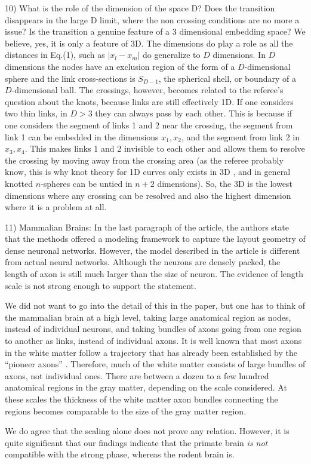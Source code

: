 \documentclass[11pt]{article}
\begin{document}
\begin{response}{
10) What is the role of the dimension of the space D? Does the transition disappears in the large D limit, where the non crossing conditions are no more a issue? Is the transition a genuine feature of a 3 dimensional embedding space?
}
We believe, yes, it is only a feature of 3D.
The dimensions do play a role as all the distances in Eq.(1), such as $|x_l-x_m|$ do generalize to $D$ dimensions. 
In $D$ dimensions the nodes have an exclusion region of the form of a $D$-dimensional sphere and the link cross-sections is $S_{D-1}$, the spherical shell, or boundary of a $D$-dimensional ball. 
The crossings, however, becomes related to the referee's question about the knots, because links are still effectively 1D.
If one considers two thin links, in $D>3$ they can always pass by each other. 
This is because if one considers the segment of links 1 and 2 near the crossing, the segment from link 1 can be embedded in the dimensions $x_1,x_2$, and the segment from link 2 in $x_3,x_4$. 
This makes links 1 and 2 invisible to each other and allows them to resolve the crossing by moving away from the crossing area (as the referee probably know, this is why knot theory for 1D curves only exists in 3D \cite{zeeman1963unknotting}, and in general knotted $n$-spheres can be untied in $n+2$ dimensions). 
So, the 3D is the lowest dimensions where any crossing can be resolved and also the highest dimension where it is a problem at all.  
\end{response}
\begin{response}{
11) Mammalian Brains: In the last paragraph of the article, the authors state that the methods offered a modeling framework to capture the layout geometry of dense neuronal networks. However, the model described in the article is different from actual neural networks. Although the neurons are densely packed, the length of axon is still much larger than the size of neuron. The evidence of length scale is not strong enough to support the statement. 


}
We did not want to go into the detail of this in the paper, but one has to think of the mammalian brain at a high level, taking large anatomical region as nodes, instead of individual neurons, and taking bundles of axons going from one region to another as links, instead of individual axons. 
It is well known that most axons in the white matter follow a trajectory that has already been established by the ``pioneer axons'' \cite{raper2010cellular}. 
Therefore, much of the white matter consists of large bundles of axons, not individual ones. 
There are between a dozen to a few hundred anatomical regions in the gray matter, depending on the scale considered.
At these scales the thickness of the white matter axon bundles connecting the regions becomes comparable to the size of the gray matter region.

We do agree that the scaling alone does not prove any relation. 
However, it is quite significant that our findings indicate that the primate brain {\em is not} compatible with the strong phase, whereas the rodent brain is. 

\end{response}
\end{document}

